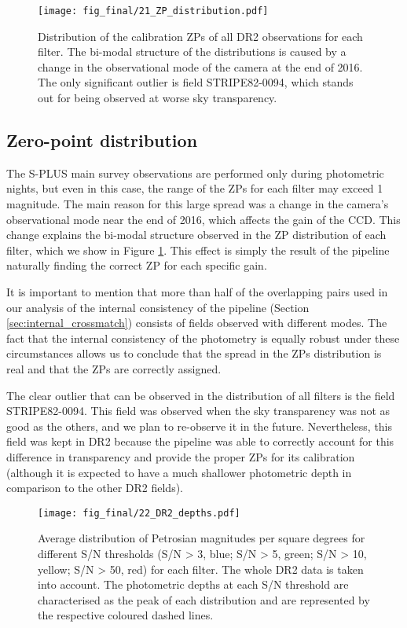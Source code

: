 \documentclass[fleqn,usenatbib]{mnras}
\begin{document}
\begin{figure}
\begin{center}
\texttt{[image: fig\_final/21\_ZP\_distribution.pdf]}
\caption{\label{fig:ZP_dist} Distribution of the calibration ZPs of all DR2 observations for each filter. The bi-modal structure of the distributions is caused by a change in the observational mode of the camera at the end of 2016. The only significant outlier is field STRIPE82-0094, which stands out for being observed at worse sky transparency.}
\end{center}
\end{figure}

\subsection{Zero-point distribution}

The S-PLUS main survey observations are performed only during photometric nights, but even in this case, the range of the ZPs for each filter may exceed 1 magnitude. The main reason for this large spread was a change in the camera's observational mode near the end of 2016, which affects the gain of the CCD. This change explains the bi-modal structure observed in the ZP distribution of each filter, which we show in Figure \ref{fig:ZP_dist}. This effect is simply the result of the pipeline naturally finding the correct ZP for each specific gain.

It is important to mention that more than half of the overlapping pairs used in our analysis of the internal consistency of the pipeline (Section \ref{sec:internal_crossmatch}) consists of fields observed with different modes. The fact that the internal consistency of the photometry is equally robust under these circumstances allows us to conclude that the spread in the ZPs distribution is real and that the ZPs are correctly assigned. 
 
The clear outlier that can be observed in the distribution of all filters is the field STRIPE82-0094. This field was observed when the sky transparency was not as good as the others, and we plan to re-observe it in the future. Nevertheless, this field was kept in DR2 because the pipeline was able to correctly account for this difference in transparency and provide the proper ZPs for its calibration (although it is expected to have a much shallower photometric depth in comparison to the other DR2 fields).

\begin{figure}
\begin{center}
\texttt{[image: fig\_final/22\_DR2\_depths.pdf]}
\caption{\label{fig:depth} Average distribution of Petrosian magnitudes per square degrees for different S/N thresholds (S/N > 3, blue; S/N > 5, green; S/N > 10, yellow; S/N > 50, red) for each filter. The whole DR2 data is taken into account. The photometric depths at each S/N threshold are characterised as the peak of each distribution and are represented by the respective coloured dashed lines.}
\end{center}
\end{figure}
\end{document}
